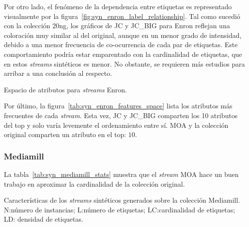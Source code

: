 Por otro lado, el fenómeno de la dependencia entre etiquetas es representado
visualmente por la figura~\ref{fig:syn_enron_label_relationship}. Tal como
sucedió con la colección 20ng, los gráficos de JC y JC\_BIG para Enron reflejan
una coloración muy similar al del original, aunque en un menor grado de
intensidad, debido a una menor frecuencia de co-ocurrencia de cada par de
etiquetas. Este comportamiento podría estar emparentado con la cardinalidad de
etiquetas, que en estos \textit{streams} sintéticos es menor. No obstante, se
requieren más estudios para arribar a una conclusión al respecto.

\bigskip

\begin{table}[htbp]
	\centering
	\begin{adjustbox}{max width=\textwidth, height=2.75cm}
		
	\end{adjustbox}
	\caption{Espacio de atributos para \textit{streams} Enron.}
	\label{tab:syn_enron_features_space}
\end{table}

\bigskip

Por último, la figura~\ref{tab:syn_enron_features_space} lista los atributos más
frecuentes de cada \textit{stream}. Esta vez, JC y JC\_BIG comparten los 10
atributos del top y solo varía levemente el ordenamiento entre sí. MOA y la
colección original comparten un atributo en el top: $10$.

\subsubsection{Mediamill}

La tabla~\ref{tab:syn_mediamill_stats} muestra que el \textit{stream} MOA hace
un buen trabajo en aproximar la cardinalidad de la colección original.

\bigskip
\begin{table}[htbp]
	\centering
	\begin{adjustbox}{max width=\textwidth}
		
	\end{adjustbox}
	\caption[Características de los \textit{streams} sintéticos generados sobre
		la colección Mediamill.]{Características de los \textit{streams}
		sintéticos generados sobre la colección Mediamill.  N:\@ número de
		instancias; L:\@ número de etiquetas; LC:\@ cardinalidad de etiquetas; LD:\@
		densidad de etiquetas.}
	\label{tab:syn_mediamill_stats}
\end{table}

